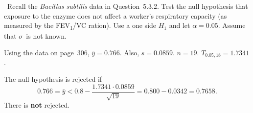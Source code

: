 \begin{problem}
  ~Recall the \textit{Bacillus subtilis} data in Question~5.3.2.  Test the null hypothesis that exposure to the enzyme does not affect a worker's respiratory capacity (as measured by the FEV\textsubscript{1}/VC ration).  Use a one side $H_1$ and let ${\alpha = 0.05}$.  Assume that $\sigma$~is not known.
\end{problem}

Using the data on page~306, ${\bar{y} = 0.766}$.  Also, ${s = 0.0859}$.  ${n = 19}$.  ${T_{0.05,18} = 1.7341}$.

The null hypothesis is rejected if
\begin{equation}
  0.766 = \bar{y} < 0.8 - \frac{1.7341 \cdot 0.0859}{\sqrt{19}} = 0.800 - 0.0342 = 0.7658 \text{.}
\end{equation}
There is \textbf{not} rejected.
